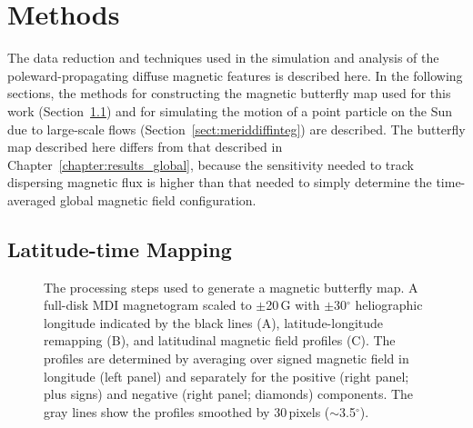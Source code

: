 \section{Methods}\label{sect:diffmeth}

The data reduction and techniques used in the simulation and analysis of the poleward-propagating diffuse magnetic features is described here. In the following sections, the methods for constructing the magnetic butterfly map used for this work (Section~\ref{sect:lattimemeth}) and for simulating the motion of a point particle on the Sun due to large-scale flows (Section~\ref{sect:meriddiffinteg}) are described. The butterfly map described here differs from that described in Chapter~\ref{chapter:results_global}, because the sensitivity needed to track dispersing magnetic flux is higher than that needed to simply determine the time-averaged global magnetic field configuration.

\subsection{Latitude-time Mapping}\label{sect:lattimemeth}

\begin{figure}[!t]
\caption[The processing steps used to generate a butterfly map.]{The processing steps used to generate a magnetic butterfly map. A full-disk MDI magnetogram scaled to $\pm$20\,G with $\pm$30$^{\circ}$ heliographic longitude indicated by the black lines (A), latitude-longitude remapping (B), and latitudinal magnetic field profiles (C). The profiles are determined by averaging over signed magnetic field in longitude (left panel) and separately for the positive (right panel; plus signs) and negative (right panel; diamonds) components. The gray lines show the profiles smoothed by 30\,pixels ($\sim$3.5$^{\circ}$).}
   \label{fig:butterflymethod}
\end{figure}


